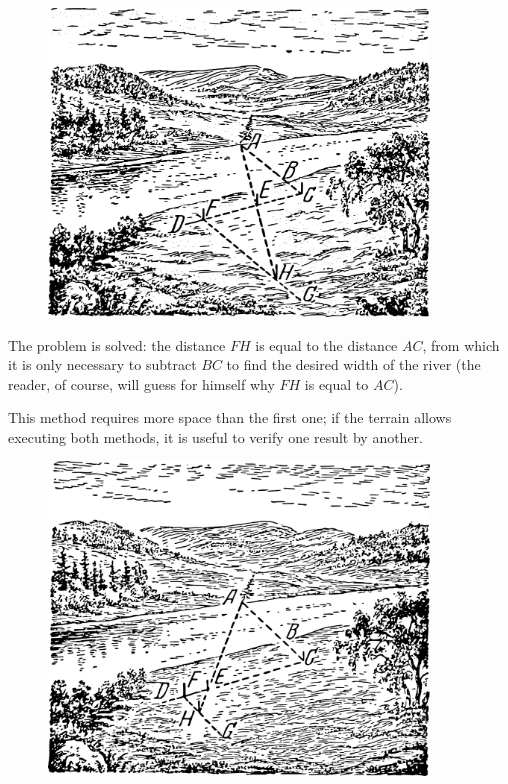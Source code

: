 \begin{enumerate}
\begin{figure}[h!]
\centering
\includegraphics[width=0.9\textwidth]{figures/ch-02/fig-028.pdf}
\end{figure}

The problem is solved: the distance $FH$ is equal to the distance $AC$, from which it is only necessary to subtract $BC$ to find the desired width of the river (the reader, of course, will guess for himself why $FH$ is equal to $AC$).

This method requires more space than the first one; if the terrain allows executing both methods, it is useful to verify one result by another.
\begin{figure}[h!]
\centering
\includegraphics[width=0.9\textwidth]{figures/ch-02/fig-029.pdf}
\end{figure}


\end{enumerate}
